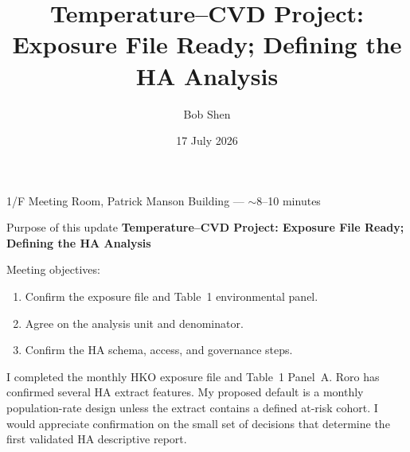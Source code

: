 \documentclass[aspectratio=169,10pt]{beamer}
\title{Temperature--CVD Project: Exposure File Ready; Defining the HA Analysis}
\author{Bob Shen}
\date{17 July 2026}
\institute{Laidlaw Scholar --- Lab meeting with Professor Bishai, Roro, Hogan, and the team}
\begin{document}
\begin{frame}
  \titlepage
  \vspace{-0.8em}
  \begin{center}
  \small 1/F Meeting Room, Patrick Manson Building --- $\sim$8--10 minutes
  \end{center}
\end{frame}

\begin{frame}{Purpose of this update}
  \textbf{Temperature--CVD Project: Exposure File Ready; Defining the HA Analysis}

  \vspace{0.6em}
  Meeting objectives:
  \begin{enumerate}
    \item Confirm the exposure file and Table~1 environmental panel.
    \item Agree on the analysis unit and denominator.
    \item Confirm the HA schema, access, and governance steps.
  \end{enumerate}

  \vspace{0.8em}
  \footnotesize
  I completed the monthly HKO exposure file and Table~1 Panel~A.
  Roro has confirmed several HA extract features.
  My proposed default is a monthly population-rate design unless the extract
  contains a defined at-risk cohort.
  I would appreciate confirmation on the small set of decisions that determine
  the first validated HA descriptive report.
\end{frame}
\end{document}
